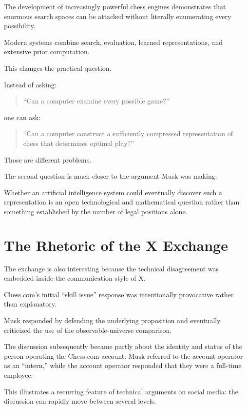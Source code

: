 \documentclass[12pt,a4paper]{article}
\begin{document}
The development of increasingly powerful chess engines demonstrates
that enormous search spaces can be attacked without literally
enumerating every possibility.

Modern systems combine search, evaluation, learned representations,
and extensive prior computation.

This changes the practical question.

Instead of asking:

\begin{quote}
    ``Can a computer examine every possible game?''
\end{quote}

one can ask:

\begin{quote}
    ``Can a computer construct a sufficiently compressed representation
    of chess that determines optimal play?''
\end{quote}

Those are different problems.

The second question is much closer to the argument Musk was making.

Whether an artificial intelligence system could eventually discover
such a representation is an open technological and mathematical
question rather than something established by the number of legal
positions alone.


\section{The Rhetoric of the X Exchange}

The exchange is also interesting because the technical disagreement
was embedded inside the communication style of X.

Chess.com's initial ``skill issue'' response was intentionally
provocative rather than explanatory.

Musk responded by defending the underlying proposition and eventually
criticized the use of the observable-universe comparison.

The discussion subsequently became partly about the identity and
status of the person operating the Chess.com account. Musk referred
to the account operator as an ``intern,'' while the account operator
responded that they were a full-time employee.

This illustrates a recurring feature of technical arguments on social
media: the discussion can rapidly move between several levels.
\end{document}
